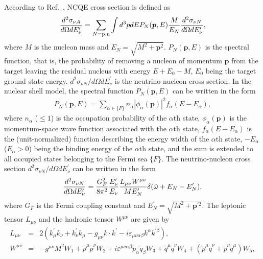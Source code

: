 \hs
According to Ref.~\cite{2012Ankowski}, NCQE cross section is defined as
\begin{eqnarray}
	{d^{2}\sigma_{\nu A} \over d\Omega dE^{\prime}_{\nu}}=\sum_{N={\rm p},{\rm n}} \int d^{3}pdEP_{N}(\bm{p}, E){M \over E_{N}}{d^{2}\sigma_{\nu N} \over d\Omega dE^{\prime}_{\nu}},
\end{eqnarray}
where $M$ is the nucleon mass and $E_{N} = \sqrt{M^{2} + \bm{p}^{2}}$.
$P_{N}(\bm{p}, E)$ is the spectral function, that is, the probability of removing a nucleon of momentum $\bm{p}$ from the target leaving the residual nucleus with energy $E+E_{0}-M$, $E_{0}$ being the target ground state energy.
$d^{2}\sigma_{\nu N}/d\Omega dE^{\prime}_{\nu}$ is the neutrino-nucleon cross section.
In the nuclear shell model, the spectral function $P_{N}(\bm{p}, E)$ can be written in the form
\begin{eqnarray}
	P_{N}(\bm{p}, E)=\sum_{\alpha\in\{F\}} n_{\alpha}|\phi_{\alpha}(\bm{p})|^{2}f_{\alpha}(E-E_{\alpha}),
\end{eqnarray}
where $n_{\alpha}$ ($\leq 1$) is the occupation probability of the $\alpha$th state, $\phi_{\alpha}(\bm{p})$ is the momentum-space wave function associated with the $\alpha$th state, $f_{\alpha}(E-E_{\alpha})$ is the (unit-normalized) function describing the energy width of the $\alpha$th state, $-E_{\alpha}$ ($E_{\alpha}>0$) being the binding energy of the $\alpha$th state, and the sum is extended to all occupied states belonging to the Fermi sea $\{F\}$.
The neutrino-nucleon cross section $d^{2}\sigma_{\nu N}/d\Omega dE^{\prime}_{\nu}$ can be written in the form
\begin{eqnarray}
	{d^{2}\sigma_{\nu N} \over d\Omega dE^{\prime}_{\nu}}={G_{F}^{2} \over 8\pi^{2}}{E^{\prime}_{\nu} \over E_{\nu}}{L_{\mu\nu}W^{\mu\nu} \over ME^{\prime}_{N}}\delta(\tilde{\omega}+E_{N}-E^{\prime}_{N}),
\end{eqnarray}
where $G_{F}$ is the Fermi coupling constant and $E^{\prime}_{N} = \sqrt{M^{2} + \bm{p}^{\prime 2}}$.
The leptonic tensor $L_{\mu\nu}$ and the hadronic tensor $W^{\mu\nu}$ are given by
\begin{eqnarray}
	L_{\mu\nu}&=&2(k^{\prime}_{\mu}k_{\nu} + k^{\prime}_{\nu}k_{\mu} - g_{\mu\nu}k \cdot k^{\prime} - i\varepsilon_{\mu\nu\alpha\beta}k^{\alpha}k^{\prime\beta}), \\
	W^{\mu\nu}&=&-g^{\mu\nu}M^{2}W_{1} + \tilde{p}^{\mu}\tilde{p}^{\nu}W_{2} + i\varepsilon^{\mu\nu\alpha\beta}\tilde{p}_{\alpha}\tilde{q}_{\beta}W_{3} + \tilde{q}^{\mu}\tilde{q}^{\nu}W_{4} + (\tilde{p}^{\mu}\tilde{q}^{\nu} + \tilde{p}^{\nu}\tilde{q}^{\mu})W_{5},
\end{eqnarray}
